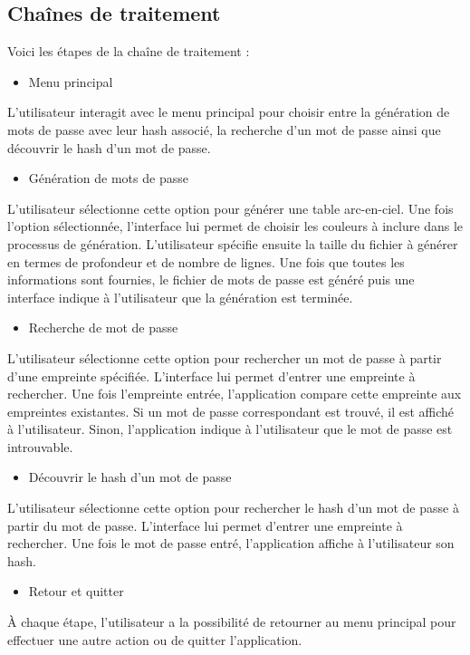 \documentclass[a4paper,12pt]{article}
\begin{document}
\subsection{Chaînes de traitement}
Voici les étapes de la chaîne de traitement :\\
\begin{itemize}
    \item Menu principal
\end{itemize}
L'utilisateur interagit avec le menu principal pour choisir entre la génération de mots de passe avec leur hash associé, la recherche d'un mot de passe ainsi que découvrir le hash d'un mot de passe.\newline
\begin{itemize}
    \item Génération de mots de passe
\end{itemize}
L'utilisateur sélectionne cette option pour générer une table arc-en-ciel. Une fois l'option sélectionnée, l'interface lui permet de choisir les couleurs à inclure dans le processus de génération. L'utilisateur spécifie ensuite la taille du fichier à générer en termes de profondeur et de nombre de lignes. Une fois que toutes les informations sont fournies, le fichier de mots de passe est généré puis une interface indique à l'utilisateur que la génération est terminée.\newline
\begin{itemize}
    \item Recherche de mot de passe
\end{itemize}
L'utilisateur sélectionne cette option pour rechercher un mot de passe à partir d'une empreinte spécifiée. L'interface lui permet d'entrer une empreinte à rechercher. Une fois l'empreinte entrée, l'application compare cette empreinte aux empreintes existantes. Si un mot de passe correspondant est trouvé, il est affiché à l'utilisateur. Sinon, l'application indique à l'utilisateur que le mot de passe est introuvable.\newline
\begin{itemize}
    \item Découvrir le hash d'un mot de passe
\end{itemize}
L'utilisateur sélectionne cette option pour rechercher le hash d'un mot de passe à partir du mot de passe. L'interface lui permet d'entrer une empreinte à rechercher. Une fois le mot de passe entré, l'application affiche à l'utilisateur son hash.\newline
\begin{itemize}
    \item Retour et quitter
\end{itemize}
À chaque étape, l'utilisateur a la possibilité de retourner au menu principal pour effectuer une autre action ou de quitter l'application.
\end{document}
